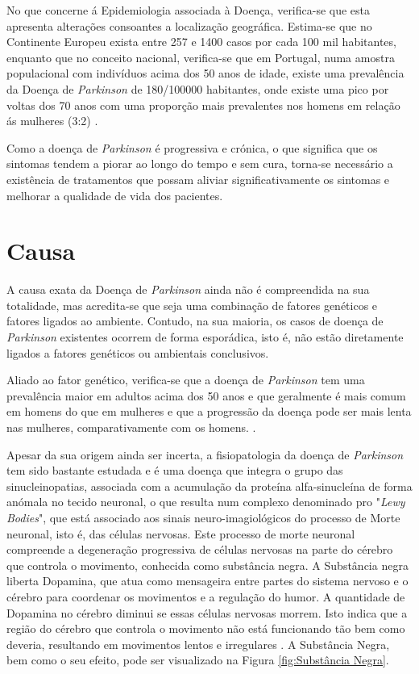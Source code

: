 \documentclass[12pt,a4paper,twoside]{report}
\begin{document}
{No que concerne á Epidemiologia associada à Doença, verifica-se que esta apresenta alterações consoantes a localização geográfica. Estima-se que no Continente Europeu exista entre 257 e 1400 casos por cada 100 mil habitantes, enquanto que no conceito nacional, verifica-se que em Portugal, numa amostra populacional com indivíduos acima dos 50 anos de idade, existe uma prevalência da Doença de \textit{Parkinson} de 180/100000 habitantes, onde existe uma pico por voltas dos 70 anos com uma proporção mais prevalentes nos homens em relação ás mulheres (3:2) \cite{Cabreira_Massano_2019}.

Como a doença de \textit{Parkinson} é progressiva e crónica, o que significa que os sintomas tendem a piorar ao longo do tempo e sem cura, torna-se necessário a existência de tratamentos que possam aliviar significativamente os sintomas e melhorar a qualidade de vida dos pacientes.

\section{Causa}

A causa exata da Doença de \textit{Parkinson} ainda não é compreendida na sua totalidade, mas acredita-se que seja uma combinação de fatores genéticos e fatores ligados ao ambiente. Contudo, na sua maioria, os casos de doença de \textit{Parkinson} existentes ocorrem de forma esporádica, isto é, não estão diretamente ligados a fatores genéticos ou ambientais conclusivos.

Aliado ao fator genético, verifica-se que a doença de \textit{Parkinson} tem uma prevalência maior em adultos acima dos 50 anos e que geralmente é mais comum em homens do que em mulheres e que a progressão da doença pode ser mais lenta nas mulheres, comparativamente com os homens.  \cite{GILLIES2014370}.

Apesar da sua origem ainda ser incerta, a fisiopatologia da doença de \textit{Parkinson} tem sido bastante estudada e é uma doença que integra o grupo das sinucleinopatias, associada com a acumulação da proteína alfa-sinucleína de forma anómala no tecido neuronal, o que resulta num complexo denominado pro "\textit{Lewy Bodies}", que está associado aos sinais neuro-imagiológicos do processo de Morte neuronal, isto é, das células nervosas. Este processo de morte neuronal compreende a degeneração progressiva de células nervosas na parte do cérebro que controla o movimento, conhecida como substância negra. A Substância negra liberta Dopamina, que atua como mensageira entre partes do sistema nervoso e o cérebro para coordenar os movimentos e a regulação do humor. A quantidade de Dopamina no cérebro diminui se essas células nervosas morrem. Isto indica que a região do cérebro que controla o movimento não está funcionando tão bem como deveria, resultando em movimentos lentos e irregulares \cite{Dopamina}. A Substância Negra, bem como o seu efeito, pode ser visualizado na Figura \ref{fig:Substância Negra}.

}
\end{document}
